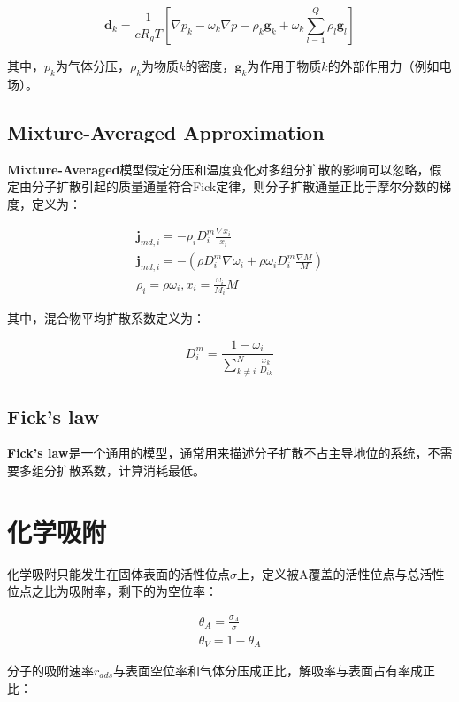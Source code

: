 \begin{equation}
    \bm{d}_k = \frac{1}{cR_gT} \left[ \nabla p_k-\omega_k\nabla p - \rho_k \bm{g}_k +\omega_k \sum_{l=1}^{Q} \rho_l \bm{g}_l \right]
\end{equation}

其中，$p_k$为气体分压，$\rho_k$为物质$k$的密度，$\bm{g}_k$为作用于物质$k$的外部作用力（例如电场）。

\subsection{Mixture-Averaged Approximation}
\textbf{Mixture-Averaged}模型假定分压和温度变化对多组分扩散的影响可以忽略，假定由分子扩散引起的质量通量符合Fick定律，则分子扩散通量正比于摩尔分数的梯度，定义为：

\begin{gather}
    \bm{j}_{md,i} = -\rho_i D_i^m \frac{\nabla x_i}{x_i} \\
    \bm{j}_{md,i} = -\left( \rho D_i^m \nabla \omega_i + \rho \omega_i D_i^m \frac{\nabla M}{M} \right) \\
    \rho_i = \rho\omega_i, x_i = \frac{\omega_i}{M_i} M
\end{gather}

其中，混合物平均扩散系数定义为：

\begin{equation}
    D_i^m = \frac{1-\omega_i}{\sum_{k\neq i}^N \frac{x_k}{D_{ik}}}
\end{equation}

\subsection{Fick's law}
\textbf{Fick's law}是一个通用的模型，通常用来描述分子扩散不占主导地位的系统，不需要多组分扩散系数，计算消耗最低。

\section{化学吸附}
化学吸附只能发生在固体表面的活性位点$ \sigma $上，定义被A覆盖的活性位点与总活性位点之比为吸附率，剩下的为空位率：

\begin{gather}
    \theta_A = \frac{\sigma_A}{\sigma} \\
    \theta_V = 1-\theta_A
\end{gather}

分子的吸附速率$ r_{ads} $与表面空位率和气体分压成正比，解吸率与表面占有率成正比：

